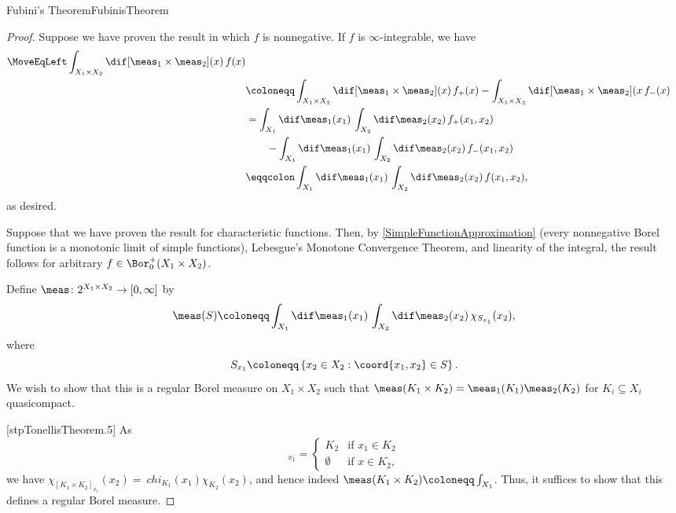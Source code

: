 \begin{thm}{Fubini's Theorem}{FubinisTheorem}
\begin{proof}
Suppose we have proven the result in which $f$ is nonnegative.  If $f$ is $\infty$-integrable, we have
\begin{equation}
\begin{split}
\MoveEqLeft
\int _{X_1\times X_2}\dif [\meas _1\times \meas _2](x)\, f(x) \\
& \coloneqq \int _{X_1\times X_2}\dif [\meas _1\times \meas _2](x)\, f_+(x)-\int _{X_1\times X_2}\dif [\meas _1\times \meas _2](x\, f_-(x) \\
& =\int _{X_1}\dif \meas _1(x_1)\, \int _{X_2}\dif \meas _2(x_2)\, f_+(x_1,x_2) \\
& \qquad -\int _{X_1}\dif \meas _1(x_1)\, \int _{X_2}\dif \meas _2(x_2)\, f_-(x_1,x_2) \\
& \eqqcolon \int _{X_1}\dif \meas _1(x_1)\, \int _{X_2}\dif \meas _2(x_2)\, f(x_1,x_2),
\end{split}
\end{equation}
as desired.

Suppose that we have proven the result for characteristic functions.  Then, by \cref{SimpleFunctionApproximation} (every nonnegative Borel function is a monotonic limit of simple functions), Lebesgue's Monotone Convergence Theorem, and linearity of the integral, the result follows for arbitrary $f\in \Bor _0^+(X_1\times X_2)$.

Define $\meas \colon 2^{X_1\times X_2}\rightarrow [0,\infty ]$ by
\begin{equation}
\meas (S)\coloneqq \int _{X_1}\dif \meas _1(x_1)\, \int _{X_2}\dif \meas _2(x_2)\, \chi _{S_{x_1}}(x_2),
\end{equation}
where
\begin{equation}
S_{x_1}\coloneqq \left\{ x_2\in X_2:\coord{x_1,x_2}\in S\right\} .
\end{equation}
We wish to show that this is a regular Borel measure on $X_1\times X_2$ such that $\meas (K_1\times K_2)=\meas _1(K_1)\meas _2(K_2)$ for $K_i\subseteq X_i$ quasicompact.

[stpTonellisTheorem.5]
As
\begin{equation}
[K_1\times K_2]_{x_1}=\begin{cases}K_2 & \text{if }x_1\in K_2 \\ \emptyset & \text{if }x\in K_2^{\comp},\end{cases}
\end{equation}
we have $\chi _{[K_1\times K_2]_{x_1}}(x_2)=\ chi _{K_1}(x_1)\chi _{K_2}(x_2)$, and hence indeed $\meas (K_1\times K_2)\coloneqq \int _{X_1}$.  Thus, it suffices to show that this defines a regular Borel measure.


\end{proof}
\end{thm}

